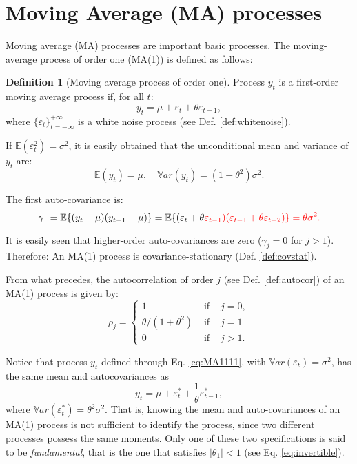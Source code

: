\documentclass[
  12pt,
]{book}
\theoremstyle{definition}
\newtheorem{definition}{Definition}[chapter]
\theoremstyle{definition}
\theoremstyle{definition}
\theoremstyle{definition}
\theoremstyle{remark}
\begin{document}
\hypertarget{moving-average-ma-processes}{%
\section{Moving Average (MA) processes}\label{moving-average-ma-processes}}

Moving average (MA) processes are important basic processes. The moving-average process of order one (MA(1)) is defined as follows:

\begin{definition}[Moving average process of order one]
\protect\hypertarget{def:MA1}{}\label{def:MA1}Process \(y_t\) is a first-order moving average process if, for all \(t\):
\begin{equation}
y_t = \mu + \varepsilon_t + \theta \varepsilon_{t-1},\label{eq:MA1111}
\end{equation}
where \(\{\varepsilon_t\}_{t = -\infty}^{+\infty}\) is a white noise process (see Def. \ref{def:whitenoise}).
\end{definition}

If \(\mathbb{E}(\varepsilon_t^2)=\sigma^2\), it is easily obtained that the unconditional mean and variance of \(y_t\) are:
\[
\mathbb{E}(y_t) = \mu, \quad \mathbb{V}ar(y_t) = (1+\theta^2)\sigma^2.
\]

The first auto-covariance is:
\[
\gamma_1=\mathbb{E}\{(y_t - \mu)(y_{t-1} - \mu)\}=\mathbb{E}\{(\varepsilon_t + \theta \color{red}{\varepsilon_{t-1}})(\color{red}{\varepsilon_{t-1}} + \theta \varepsilon_{t-2})\} = \theta \sigma^2.
\]

It is easily seen that higher-order auto-covariances are zero (\(\gamma_j=0\) for \(j>1\)). Therefore: An MA(1) process is covariance-stationary (Def. \ref{def:covstat}).

From what precedes, the autocorrelation of order \(j\) (see Def. \ref{def:autocor}) of an MA(1) process is given by:
\[
\rho_j =
\left\{
\begin{array}{lll}
1 &\mbox{ if }& j=0,\\
\theta / (1 + \theta^2) &\mbox{ if }& j = 1\\
0 &\mbox{ if }& j>1.
\end{array}
\right.
\]

Notice that process \(y_t\) defined through Eq. \eqref{eq:MA1111}, with \(\mathbb{V}ar(\varepsilon_t)=\sigma^2\), has the same mean and autocovariances as
\[
y_t = \mu + \varepsilon^*_t +\frac{1}{\theta}\varepsilon^*_{t-1},
\]
where \(\mathbb{V}ar(\varepsilon^*_t)=\theta^2\sigma^2\). That is, knowing the mean and auto-covariances of an MA(1) process is not sufficient to identify the process, since two different processes possess the same moments. Only one of these two specifications is said to be \emph{fundamental}, that is the one that satisfies \(|\theta_1|<1\) (see Eq. \eqref{eq:invertible}).
\end{document}
